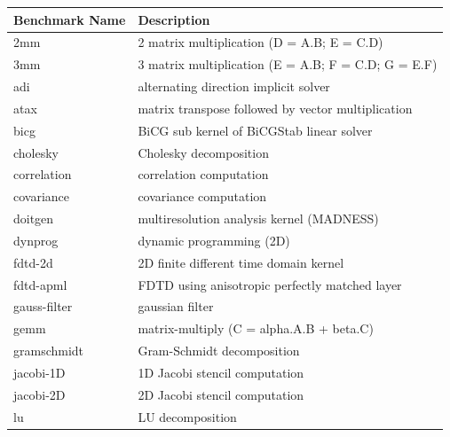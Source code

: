 \begin{table}
    \centering
    \begin{tabular}{|l|l|}
        \hline
        \textbf{Benchmark Name} & \textbf{Description}                                \\ \hline
        2mm                     & 2 matrix multiplication (D = A.B; E = C.D)          \\ \hline
        3mm                     & 3 matrix multiplication (E = A.B; F = C.D; G = E.F) \\ \hline
        adi                     & alternating direction implicit solver               \\ \hline
        atax                    & matrix transpose followed by vector multiplication  \\ \hline
        bicg                    & BiCG sub kernel of BiCGStab linear solver           \\ \hline
        cholesky                & Cholesky decomposition                              \\ \hline
        correlation             & correlation computation                             \\ \hline
        covariance              & covariance computation                              \\ \hline
        doitgen                 & multiresolution analysis kernel (MADNESS)           \\ \hline
        dynprog                 & dynamic programming (2D)                            \\ \hline
        fdtd-2d                 & 2D finite different time domain kernel              \\ \hline
        fdtd-apml               & FDTD using anisotropic perfectly matched layer      \\ \hline
        gauss-filter            & gaussian filter                                     \\ \hline
        gemm                    & matrix-multiply (C = alpha.A.B + beta.C)            \\ \hline
        gramschmidt             & Gram-Schmidt decomposition                          \\ \hline
        jacobi-1D               & 1D Jacobi stencil computation                       \\ \hline
        jacobi-2D               & 2D Jacobi stencil computation                       \\ \hline
        lu                      & LU decomposition                                    \\ \hline

\end{tabular}
\end{table}
